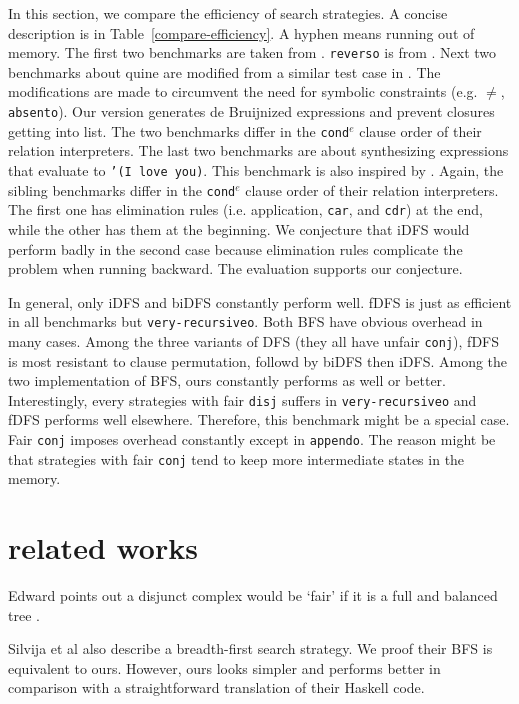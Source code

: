 \documentclass[format=acmlarge, review=true, authordraft=true]{acmart}
\newcommand{\conde}{\texttt{cond$^e$} }
\newcommand{\conj}{\texttt{conj}}
\newcommand{\disj}{\texttt{disj}}
\begin{document}
In this section, we compare the efficiency of search strategies. A concise 
description is in Table~\ref{compare-efficiency}. A hyphen means running out of 
memory. The first two benchmarks are taken from 
\citep{friedman_reasoned_2018}. \texttt{reverso} is from 
\citep{rozplokhas2018improving}. Next two benchmarks 
about quine are modified from a similar test case in \citep{byrd2017unified}. 
The modifications are made 
to circumvent the need for symbolic constraints (e.g. $\neq$, 
\texttt{absento}). Our version generates de 
Bruijnized expressions and prevent closures getting into list. The two 
benchmarks differ in the \conde clause order of their relation interpreters. 
The last two 
benchmarks are about synthesizing expressions that evaluate to \texttt{'(I love 
you)}. This benchmark is also inspired by \citep{byrd2017unified}. Again, the 
sibling benchmarks differ in the \conde clause order of their relation 
interpreters. The first one 
has elimination rules (i.e. application, \texttt{car}, and \texttt{cdr}) at the 
end, while the other has them at the beginning. We conjecture that iDFS would 
perform badly in the second case because elimination rules complicate the 
problem when running backward. The evaluation supports our conjecture.

In general, only iDFS and biDFS constantly perform well. fDFS is just as 
efficient in all benchmarks but \texttt{very-recursiveo}. Both BFS have obvious 
overhead in many cases. Among the three variants of DFS (they all have unfair 
\conj{}), fDFS is most resistant to clause permutation, followd by biDFS then 
iDFS. Among the two implementation of BFS, ours constantly performs as well or 
better. Interestingly, every strategies with fair \disj{} suffers in 
\texttt{very-recursiveo} and fDFS performs well elsewhere. Therefore, this 
benchmark might be a special case. Fair \conj{} imposes overhead constantly 
except in \texttt{appendo}. The reason might be that strategies with fair 
\conj{} tend to keep more intermediate states in the memory.

\section{related works}

Edward points out a disjunct complex would be `fair' if it is a full and 
balanced tree \citep{yang2010adventures}.

Silvija et al \citep{seres1999algebra} also describe a breadth-first search 
strategy. We proof their BFS is equivalent to ours. However, ours looks simpler 
and performs better in comparison with a straightforward translation of their 
Haskell code.
\end{document}
